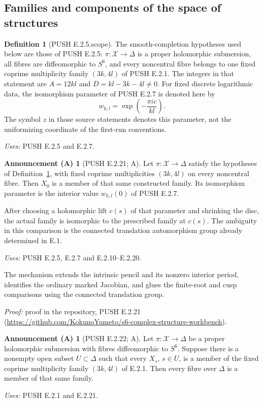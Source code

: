 \documentclass[11pt,a4paper]{article}
\theoremstyle{plain}
\theoremstyle{definition}
\newtheorem{announcement}[theorem]{Announcement (A)}
\newtheorem{definition}[theorem]{Definition}
\begin{document}
\subsection{Families and components of the space of structures}
\begin{definition}[PUSH E.2.5.scope]\label{push:E.2.5.scope}
The smooth-completion hypotheses used below are those of PUSH E.2.5:
$\pi:\mathcal X\to\Delta$ is a proper holomorphic submersion,
all fibres are diffeomorphic to $S^6$, and every noncentral fibre belongs
to one fixed coprime multiplicity family $(3k,4l)$ of PUSH E.2.1.
The integers in that statement are $A=12kl$ and $D=kl-3k-4l\ne0$.
For fixed discrete logarithmic data, the isomorphism parameter of
PUSH E.2.7 is denoted here by
\[
 w_{k,l}=\exp\!\left(-\frac{\pi i c}{kl}\right).
\]
The symbol $z$ in those source statements denotes this parameter,
not the uniformizing coordinate of the first-run conventions.
\end{definition}
\noindent\emph{Uses:} PUSH E.2.5 and E.2.7.\par

\begin{announcement}[PUSH E.2.21; A]\label{push:E.2.21}
Let $\pi:\mathcal X\to\Delta$ satisfy the hypotheses of
Definition~\ref{push:E.2.5.scope}, with fixed coprime multiplicities $(3k,4l)$ on
every noncentral fibre.  Then $X_0$ is a member of that
same constructed family.  Its isomorphism parameter is
the interior value $w_{k,l}(0)$ of PUSH E.2.7.

After choosing a holomorphic lift $c(s)$ of that parameter
and shrinking the disc, the actual family is isomorphic
to the prescribed family at $c(s)$.  The ambiguity in
this comparison is the connected translation automorphism
group already determined in E.1.
\end{announcement}
\noindent\emph{Uses:} PUSH E.2.5, E.2.7 and E.2.10--E.2.20.\par

The mechanism extends the intrinsic pencil and its nonzero interior period, identifies the ordinary marked Jacobian, and glues the finite-root and cusp comparisons using the connected translation group.

\noindent\emph{Proof:} proof in the repository, PUSH E.2.21 (\url{https://github.com/KokunoYumeto/s6-complex-structure-workbench}).

\begin{announcement}[PUSH E.2.22; A]\label{push:E.2.22}
Let $\pi:\mathcal X\to\Delta$ be a proper holomorphic
submersion with fibres diffeomorphic to $S^6$.  Suppose
there is a nonempty open subset $U\subset\Delta$ such
that every $X_s$, $s\in U$, is a member of the fixed
coprime multiplicity family $(3k,4l)$ of E.2.1.
Then every fibre over $\Delta$ is a member of that
same family.
\end{announcement}
\noindent\emph{Uses:} PUSH E.2.1 and E.2.21.\par
\end{document}

